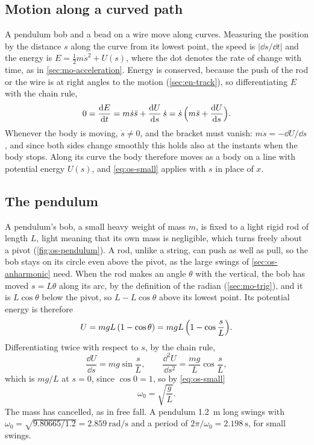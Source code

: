 \subsection*{Motion along a curved path}

A pendulum bob and a bead on a wire move along curves.
Measuring the position by the distance $s$ along the curve from its lowest
point, the speed is $\lvert\dd s/\dd t\rvert$ and the energy is $E =
\frac12 m\dot{s}^2 + U(s)$, where the dot denotes the rate of change with
time, as in \cref{sec:mo-acceleration}. Energy is conserved, because the push of
the rod or the wire is at right angles to the motion (\cref{sec:en-track}),
so differentiating $E$ with the chain rule,
\begin{equation*}
   0 = \frac{\mathrm{d} E}{\mathrm{d} t} = m\dot{s}\ddot{s} + \frac{\mathrm{d} U}{\mathrm{d} s}\,\dot{s}
   = \dot{s}\,\Bigl(m\ddot{s} + \frac{\mathrm{d} U}{\mathrm{d} s}\Bigr) .
\end{equation*}
Whenever the body is moving, $\dot{s} \neq 0$, and the bracket must vanish:
$m\ddot{s} = -\dd U/\dd s$, and since both sides change smoothly this
holds also at the instants when the body stops. Along its curve the body therefore moves as a
body on a line with potential energy $U(s)$, and \cref{eq:os-small}
applies with $s$ in place of $x$.

\subsection*{The pendulum}

A pendulum's bob, a small heavy weight of mass $m$, is fixed to a light
rigid rod of length $L$, light meaning that its own mass is negligible,
which turns freely about a pivot (\cref{fig:os-pendulum}). A rod, unlike
a string, can push as well as pull, so the bob stays on its circle even
above the pivot, as the large swings of \cref{sec:os-anharmonic} need.
When the rod makes an angle $\theta$ with the vertical, the bob has moved
$s = L\theta$ along its arc, by the definition of the radian
(\cref{sec:mo-trig}), and it is $L\cos\theta$ below the pivot, so
$L - L\cos\theta$ above its lowest point. Its potential energy is
therefore
\begin{equation*}
   U = mgL\,(1 - \cos\theta) = mgL\,\Bigl(1 - \cos\frac{s}{L}\Bigr) .
\end{equation*}
Differentiating twice with respect to $s$, by the chain rule,
\begin{equation*}
   \frac{\dd U}{\dd s} = mg\sin\frac{s}{L} , \qquad
   \frac{\dd^2 U}{\dd s^2} = \frac{mg}{L}\cos\frac{s}{L} ,
\end{equation*}
which is $mg/L$ at $s = 0$, since $\cos 0 = 1$, so by \cref{eq:os-small}
\begin{equation*}
   \omega_0 = \sqrt{\frac{g}{L}} .
\end{equation*}
The mass has cancelled, as in free fall. A pendulum \SI{1.2}{\metre} long
swings with $\omega_0 = \sqrt{9.80665/1.2} = \SI{2.859}{\radian\per
\second}$ and a period of $2\pi/\omega_0 = \SI{2.198}{\second}$, for small
swings.

